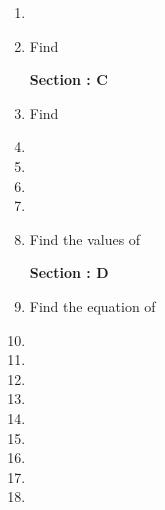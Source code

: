 \documentclass[12pt,a4paper]{article}
\begin{document}
\begin {enumerate}
\item

\item Find



\begin{center}

\textbf {Section : C}

\end{center}

\item Find 

\item

\item

\item

\item

\item Find the values of 



\begin{center}

\textbf {Section : D}

\end{center}

\item Find the equation of

\item

\item

\item

\item

\item

\item 

\item

\item

\item

\end{enumerate}

\end{document}
